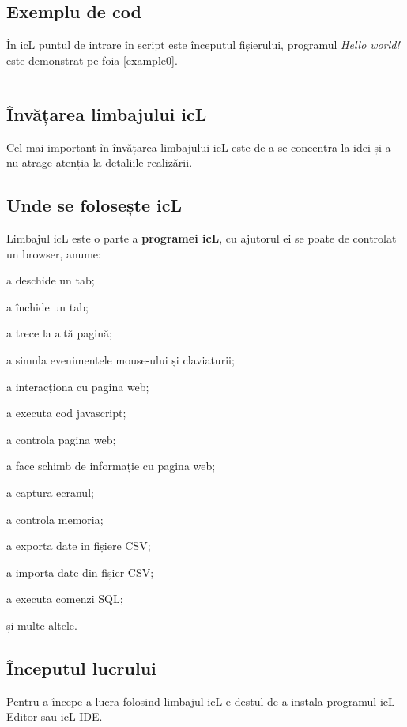 \subsection{Exemplu de cod}

În icL puntul de intrare în script este începutul fișierului, programul \textit{Hello world!} este demonstrat pe foia \ref{example0}.

\begin{listing}
    \label{example0}
    \inputminted[linenos]{icl}{../sources/helloworld.icL}
\end{listing}

\subsection{Învățarea limbajului icL}

Cel mai important în învățarea limbajului icL este de a se concentra la idei și a nu atrage atenția la detaliile realizării.

\subsection{Unde se folosește icL}

Limbajul icL este o parte a \textbf{programei icL}, cu ajutorul ei se poate de controlat un browser, anume:
\begin{icItems}
\item
	a deschide un tab;
\item
	a închide un tab;
\item
	a trece la altă pagină;
\item
	a simula evenimentele mouse-ului și claviaturii;
\item
	a interacționa cu pagina web;
\item
	a executa cod javascript;
\item
	a controla pagina web;
\item
	a face schimb de informație cu pagina web;
\item
	a captura ecranul;
\item
	a controla memoria;
\item
	a exporta date in fișiere CSV;
\item
	a importa date din fișier CSV;
\item
	a executa comenzi SQL;
\item
	și multe altele.
\end{icItems}

\subsection{Începutul lucrului}

Pentru a începe a lucra folosind limbajul icL e destul de a instala programul icL-Editor sau icL-IDE.
